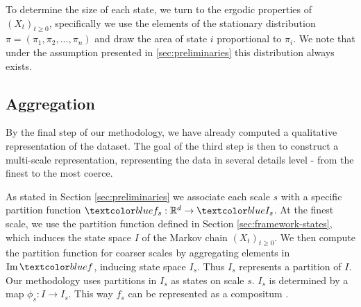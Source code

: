 To determine the size of each state, we turn to the ergodic properties of $(X_t)_{t \ge 0}$, specifically
we use the elements of the stationary distribution $\pi = (\pi_1, \pi_2, ..., \pi_n)$ and draw the area of
state $i$ proportional to $\pi_i$. We note that under the assumption presented in \ref{sec:preliminaries}
this distribution always exists.

\subsection{Aggregation}
\label{sec:framework-aggregation}

By the final step of our methodology, we have already computed a qualitative representation of the
dataset. The goal of the third step is then to construct a multi-scale representation, representing
the data in several details level - from the finest to the most coerce.

As stated in Section \ref{sec:preliminaries} we associate each scale $s$ with a specific partition
function $\lstopar{f_s}: \mathbb{R}^d \rightarrow \lstopar{I_s}$. At the finest scale, we use the 
partition function  defined in Section \ref{sec:framework-states}, which induces
the state space $I$ of the Markov chain $(X_t)_{t \ge 0}$. We then compute the partition
function for coarser scales by aggregating elements in $\Ima \lstopar{f}$, inducing state space $I_s$.
Thus $I_s$ represents a partition of $I$. Our methodology uses partitions in $I_s$ as states on scale $s$.
$I_s$ is determined by a map $\phi_s: I \rightarrow I_s$. This
way $f_s$ can be represented as a compositum .

